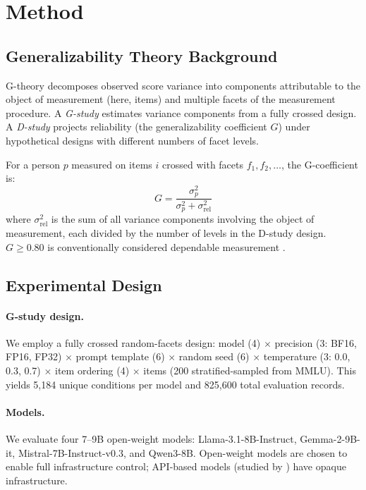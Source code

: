 \documentclass[letterpaper]{article}
\begin{document}
\section{Method}

\subsection{Generalizability Theory Background}

G-theory \citep{shavelson1991generalizability,brennan2001generalizability} decomposes observed score variance into components attributable to the object of measurement (here, items) and multiple facets of the measurement procedure. A \emph{G-study} estimates variance components from a fully crossed design. A \emph{D-study} projects reliability (the generalizability coefficient $G$) under hypothetical designs with different numbers of facet levels.

For a person $p$ measured on items $i$ crossed with facets $f_1, f_2, \ldots$, the G-coefficient is:
\begin{equation}
G = \frac{\sigma^2_p}{\sigma^2_p + \sigma^2_{\text{rel}}}
\end{equation}
where $\sigma^2_{\text{rel}}$ is the sum of all variance components involving the object of measurement, each divided by the number of levels in the D-study design. $G \geq 0.80$ is conventionally considered dependable measurement \citep{brennan2001generalizability}.

\subsection{Experimental Design}

\paragraph{G-study design.}
We employ a fully crossed random-facets design: model (4) $\times$ precision (3: BF16, FP16, FP32) $\times$ prompt template (6) $\times$ random seed (6) $\times$ temperature (3: 0.0, 0.3, 0.7) $\times$ item ordering (4) $\times$ items (200 stratified-sampled from MMLU). This yields 5,184 unique conditions per model and 825,600 total evaluation records.

\paragraph{Models.}
We evaluate four 7--9B open-weight models: Llama-3.1-8B-Instruct, Gemma-2-9B-it, Mistral-7B-Instruct-v0.3, and Qwen3-8B. Open-weight models are chosen to enable full infrastructure control; API-based models (studied by \citealp{mesting2026generalizability}) have opaque infrastructure.
\end{document}
